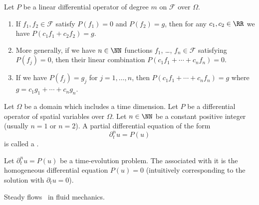 \begin{node}
\begin{theorem}\label{pde-000J}%
Let $P$ be a linear differential operator of degree $m$ on $\mathcal{F}$
over $\Omega$.
\begin{enumerate}
\item If $f_{1},f_{2}\in\mathcal{F}$ satisfy $P(f_{1})=0$ and
$P(f_{2})=g$, then for any $c_{1},c_{2}\in\RR$ we have
$P(c_{1}f_{1}+c_{2}f_{2})=g$.
\item More generally, if we have $n\in\NN$
functions $f_{1}$, \dots, $f_{n}\in\mathcal{F}$ satisfying $P(f_{j})=0$,
then their linear combination $P(c_{1}f_{1}+\cdots+c_{n}f_{n})=0$.
\item If we have $P(f_{j})=g_{j}$ for $j=1,\dots,n$, then
$P(c_{1}f_{1}+\cdots+c_{n}f_{n})=g$ where $g=c_{1}g_{1}+\cdots+c_{n}g_{n}$.
\end{enumerate}
\end{theorem}
\end{node}

\begin{node}\label{pde-000M}%
\begin{definition}\label{pde-000N}%
Let $\Omega$ be a domain which includes a time dimension.
Let $P$ be a differential operator of spatial variables over $\Omega$.
Let $n\in\NN$ be a constant positive integer (usually $n=1$ or $n=2$).
A partial differential equation of the form
\begin{equation*}
\partial_{t}^{n}u=P(u)
\end{equation*}
is called a .
\end{definition}

\begin{definition}\label{pde-000O}%
Let $\partial_{t}^{n}u=P(u)$ be a time-evolution problem. The
 associated with it is the homogeneous
differential equation $P(u)=0$ (intuitively corresponding to the
solution with $\partial_{t}u=0$).

\begin{example}\label{pde-000P}%
Steady flows~ in fluid mechanics.
\end{example}
\end{definition}
\end{node}

